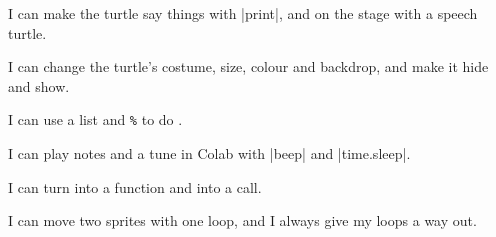 \tick I can make the turtle say things with \py|print|, and on the stage with a speech turtle.\par
\tick I can change the turtle's costume, size, colour and backdrop, and make it hide and show.\par
\tick I can use a list and \texttt{\%} to do .\par
\tick I can play notes and a tune in Colab with \py|beep| and \py|time.sleep|.\par
\tick I can turn  into a function and  into a call.\par
\tick I can move two sprites with one loop, and I always give my loops a way out.

